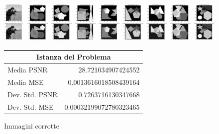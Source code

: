 \begin{figure}[H]
    \centering
    \begin{minipage}[h]{0.58\textwidth}
    \includegraphics[width=\linewidth]{output/tabCorrotte/imgcorr0.png}\label{fig:imgcorrotteGEN}
    \end{minipage}%
    \begin{minipage}[h]{0.5\textwidth}
        \centering
        \begin{tabular}{|lr|}
            \hline
            \multicolumn{2}{|c|}{\textbf{Istanza del Problema}} \\ \hline
            Media PSNR           & 28.721034907424552           \\
            Media MSE            & 0.0013616018508439164        \\
            Dev. Std. PSNR       & 0.7263716130347668           \\
            Dev. Std. MSE        & 0.00032199072780323465       \\ \hline
            \end{tabular}
    \end{minipage}
    \captionsetup{labelformat=andtable}
    \caption{Immagini corrotte}
\end{figure}
